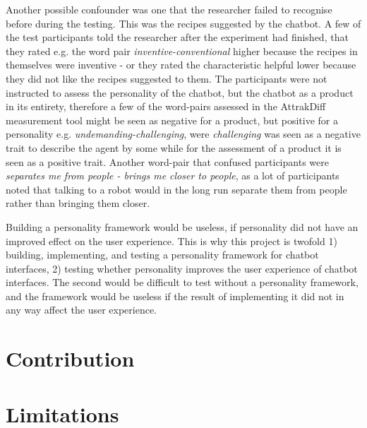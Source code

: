 Another possible confounder was one that the researcher failed to recognise before during the testing. This was the recipes suggested by the chatbot. A few of the test participants told the researcher after the experiment had finished, that they rated e.g. the word pair \textit{inventive-conventional} higher because the recipes in themselves were inventive - or they rated the characteristic helpful lower because they did not like the recipes suggested to them. The participants were not instructed to assess the personality of the chatbot, but the chatbot as a product in its entirety, therefore a few of the word-pairs assessed in the AttrakDiff measurement tool might be seen as negative for a product, but positive for a personality e.g. \textit{undemanding-challenging}, were \textit{challenging} was seen as a negative trait to describe the agent by some while for the assessment of a product it is seen as a positive trait. Another word-pair that confused participants were \textit{separates me from people - brings me closer to people}, as a lot of participants noted that talking to a robot would in the long run separate them from people rather than bringing them closer.


Building a personality framework would be useless, if personality did not have an improved effect on the user experience. This is why this project is twofold 1) building, implementing, and testing a personality framework for chatbot interfaces, 2) testing whether personality improves the user experience of chatbot interfaces. The second would be difficult to test without a personality framework, and the framework would be useless if the result of implementing it did not in any way affect the user experience.

\section{Contribution}

\section{Limitations}

